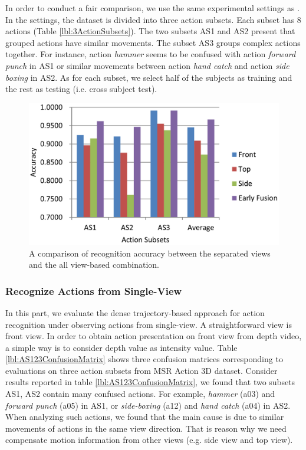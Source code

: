 \documentclass[final,3p,times,twocolumn]{elsarticle}
\begin{document}
In order to conduct a fair comparison, we use the same experimental settings as \cite{li2010action, yang2012eigenjoints, vieira2012stop, wang2012mining, wang2012robust, yang2012recognizing, xia2013spatio, oreifej2013hon4d, luo2013group}.
In the settings, the dataset is divided into three action subsets. Each subset has 8 actions (Table \ref{lbl:3ActionSubsets}).
The two subsets AS1 and AS2 present that grouped actions have similar movements.
The subset AS3 groups complex actions together.
For instance, action \textit{hammer} seems to be confused with action \textit{forward punch} in AS1 or similar movements between action \textit{hand catch} and action \textit{side boxing} in AS2.
As for each subset, we select half of the subjects as training and the rest as testing (i.e. cross subject test).

\begin{figure}[h]
	\centering
	\includegraphics[width=\columnwidth]{Figures/Chart_EarlyFusion_AS123_MBH.pdf}
	\caption{A comparison of recognition accuracy between the separated views and the all view-based combination.}
	\label{lbl:Figure_EarlyFusion_AS123_MBH}
\end{figure}

\subsubsection{Recognize Actions from Single-View}

In this part, we evaluate the dense trajectory-based approach for action recognition under observing actions from single-view.
A straightforward view is front view.
In order to obtain action presentation on front view from depth video, a simple way is to consider depth value as intensity value.
Table \ref{lbl:AS123ConfusionMatrix} shows three confusion matrices corresponding to evaluations on three action subsets from MSR Action 3D dataset.
Consider results reported in table \ref{lbl:AS123ConfusionMatrix}, we found that two subsets AS1, AS2 contain many confused actions. For example, \textit{hammer} (a03) and \textit{forward punch} (a05) in AS1, or \textit{side-boxing} (a12) and \textit{hand catch} (a04) in AS2.
When analyzing such actions, we found that the main cause is due to similar movements of actions in the same view direction.
That is reason why we need compensate motion information from other views (e.g. side view and top view).
\end{document}
